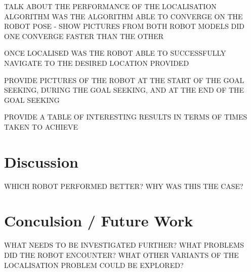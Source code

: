 \documentclass[a4paper]{article}
\begin{document}
TALK ABOUT THE PERFORMANCE OF THE LOCALISATION ALGORITHM WAS THE ALGORITHM ABLE TO CONVERGE ON THE ROBOT POSE - SHOW PICTURES FROM BOTH ROBOT MODELS DID ONE CONVERGE FASTER THAN THE OTHER

ONCE LOCALISED WAS THE ROBOT ABLE TO SUCCESSFULLY NAVIGATE TO THE DESIRED LOCATION PROVIDED

PROVIDE PICTURES OF THE ROBOT AT THE START OF THE GOAL SEEKING, DURING THE GOAL SEEKING, AND AT THE END OF THE GOAL SEEKING

PROVIDE A TABLE OF INTERESTING RESULTS IN TERMS OF TIMES TAKEN TO ACHIEVE

\section{Discussion}
WHICH ROBOT PERFORMED BETTER? WHY WAS THIS THE CASE?

\section{Conculsion / Future Work}
WHAT NEEDS TO BE INVESTIGATED FURTHER? WHAT PROBLEMS DID THE ROBOT ENCOUNTER? WHAT OTHER VARIANTS OF THE LOCALISATION PROBLEM COULD BE EXPLORED? 

\newpage



\end{document}
